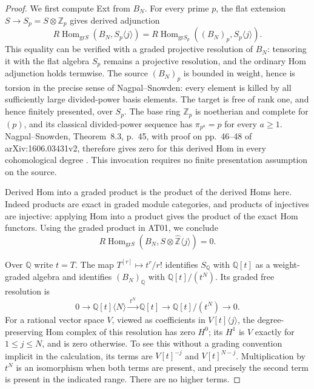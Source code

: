 \begin{proof}
We first compute Ext from $B_N$. For every prime $p$, the
flat extension $S\to S_p=S\otimes\mathbb Z_p$ gives derived
adjunction
\[
 R\operatorname{Hom}_{\mathrm{gr}S}
       (B_N,S_p\langle j\rangle)
 =R\operatorname{Hom}_{\mathrm{gr}S_p}
       ((B_N)_p,S_p\langle j\rangle).
\]
This equality can be verified with a graded projective
resolution of $B_N$: tensoring it with the flat algebra
$S_p$ remains a projective resolution, and the ordinary Hom
adjunction holds termwise. The source $(B_N)_p$ is bounded
in weight, hence is torsion in the precise sense of
Nagpal--Snowden: every element is killed by all sufficiently
large divided-power basis elements. The target is free of
rank one, and hence finitely presented, over $S_p$.
The base ring $\mathbb Z_p$ is noetherian and complete for
$(p)$, and its classical divided-power sequence has
$\pi_{p^a}=p$ for every $a\geq1$.
Nagpal--Snowden, Theorem~8.3, p.~45, with proof on
pp.~46--48 of arXiv:1606.03431v2, therefore gives zero
for this derived Hom in every cohomological degree
\cite{IC-nagpal-snowden}. This invocation requires no finite
presentation assumption on the source.

Derived Hom into a graded product is the product of the
derived Homs here. Indeed products are exact in graded
module categories, and products of injectives are injective:
applying Hom into a product gives the product of the exact
Hom functors. Using the graded product in AT01, we conclude
\[
 R\operatorname{Hom}_{\mathrm{gr}S}
 (B_N,S\otimes\widehat{\mathbb Z}\langle j\rangle)=0.
\]

Over $\mathbb Q$ write $t=T$. The map
$T^{[r]}\mapsto t^r/r!$ identifies $S_{\mathbb Q}$ with
$\mathbb Q[t]$ as a weight-graded algebra and identifies
$(B_N)_{\mathbb Q}$ with $\mathbb Q[t]/(t^N)$.
Its graded free resolution is
\[
 0\longrightarrow\mathbb Q[t]\langle N\rangle
   \xrightarrow{\ t^N\ }\mathbb Q[t]
   \longrightarrow\mathbb Q[t]/(t^N)\longrightarrow0.
\]
For a rational vector space $V$, viewed as coefficients in
$V[t]\langle j\rangle$, the degree-preserving Hom complex
of this resolution has zero $H^0$; its $H^1$ is $V$
exactly for $1\leq j\leq N$, and is zero otherwise.
To see this without a grading convention implicit in the
calculation, its terms are $V[t]^{-j}$ and $V[t]^{N-j}$.
Multiplication by $t^N$ is an isomorphism when both terms
are present, and precisely the second term is present in
the indicated range. There are no higher terms.


\end{proof}
